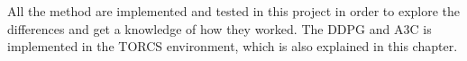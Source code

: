 All the method are implemented and tested in this project in order to explore the differences and get a knowledge of how they worked. The DDPG and A3C is implemented in the TORCS environment, which is also explained in this chapter.








